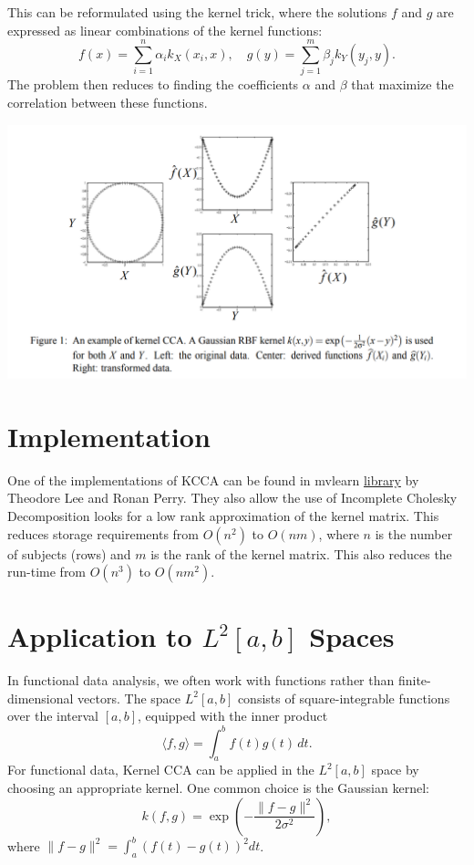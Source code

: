 \documentclass[12pt]{article}
\begin{document}
This can be reformulated using the kernel trick, where the solutions \( f \) and \( g \) are expressed as linear combinations of the kernel functions:
\[
f(x) = \sum_{i=1}^n \alpha_i k_X(x_i, x), \quad g(y) = \sum_{j=1}^m \beta_j k_Y(y_j, y).
\]
The problem then reduces to finding the coefficients \( \alpha \) and \( \beta \) that maximize the correlation between these functions.

\includegraphics[scale=0.35]{tmp_example.png}

\section{Implementation}
One of the implementations of KCCA can be found in mvlearn 
\href{https://github.com/mvlearn/mvlearn/blob/main/mvlearn/embed/kmcca.py}{library} by Theodore Lee and Ronan Perry. They also allow the use of Incomplete Cholesky Decomposition looks for a low rank approximation of the kernel matrix. This reduces storage requirements from $O(n^2)$ to $O(nm)$, where $n$ is the number of subjects (rows) and $m$ is the rank of the kernel matrix. This also reduces the run-time from $O(n^3)$ to $O(nm^2)$.
\section{Application to \( L^2[a,b] \) Spaces}

In functional data analysis, we often work with functions rather than finite-dimensional vectors. The space \( L^2[a,b] \) consists of square-integrable functions over the interval \( [a, b] \), equipped with the inner product
\[
\langle f, g \rangle = \int_a^b f(t) g(t) \, dt.
\]
For functional data, Kernel CCA can be applied in the \( L^2[a,b] \) space by choosing an appropriate kernel. One common choice is the Gaussian kernel:
\[
k(f, g) = \exp\left(-\frac{\|f - g\|^2}{2\sigma^2}\right),
\]
where \( \|f - g\|^2 = \int_a^b (f(t) - g(t))^2 dt \).
\end{document}
